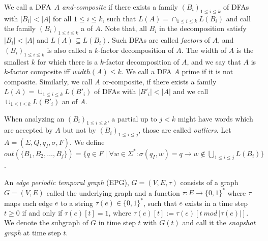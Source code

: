We call a $\textsc{DFA}$ $A$ \textit{and-composite} if there exists a family $(B_i)_{1 \leq i \leq k}$ of DFAs with $|B_i| < |A|$ for all $1 \leq i \leq k$, such that $L(A) = \cap_{1\leq i \leq k} L(B_i)$ and call the family $(B_i)_{1\leq i \leq k}$ a \textit{\andDecomp} of $A$.
Note that, all $B_i$ in the decomposition satisfy $|B_i| < |A|$ and $L(A) \subseteq L(B_i)$.
Such DFAs are called \textit{factors} of $A$, and $(B_i)_{1\leq i \leq k}$ is also called a $k$-factor decomposition of $A$.
The width of $A$ is the smallest $k$ for which there is a $k$-factor decomposition of $A$, and we say that $A$ is $k$-factor composite iff $width(A) \leq k$.
We call a DFA $A$ prime if it is not composite.
Similarly, we call $A$ or-composite, if there exists a family $L(A) = \cup_{1\leq i \leq k} L(B'_i)$ of DFAs with $|B'_i| < |A|$ and we call $\cup_{1\leq i \leq k} L(B'_i)$ an \orDecomp of $A$.

When analyzing an \orDecomp $(B_i)_{1 \leq i \leq k}$, a partial \orDecomp up to $j < k$ might have words which are accepted by $A$ but not by $(B_i)_{1 \leq i \leq j}$, those are called \textit{outliers}.
Let $A = (\Sigma, Q, q_I, \sigma, F)$.
We define $out(\{B_1, B_2, \dots, B_j\}) = \{q \in F \mid \forall w \in \Sigma^* \colon \sigma(q_I, w) = q \rightarrow w \notin \bigcup_{1\leq i \leq j} L(B_i)\}$.

An \textit{edge periodic temporal graph} (EPG), $G = (V, E, \tau)$ consists of a graph $G = (V, E)$ called the underlying graph and a function $\tau : E \rightarrow \{0, 1\}^*$ where $\tau$ maps each edge $e$ to a string $\tau(e) \in \{0, 1\}^*$, such that $e$ exists in a time step $t \geq 0$ if and only if $\tau(e)[t] = 1$, where $\tau(e)[t] := \tau(e)[t~ mod~ |\tau(e)|]$.
We denote the subgraph of $G$ in time step $t$ with $G(t)$ and call it the \textit{snapshot graph} at time step $t$.

